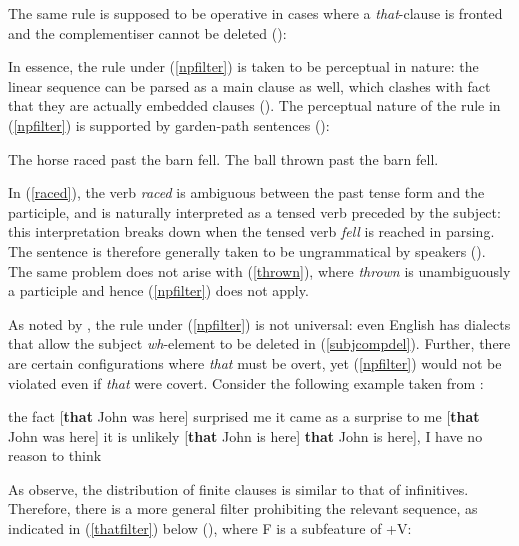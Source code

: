 \z

The same rule is supposed to be operative in cases where a \textit{that}-clause is fronted and the complementiser cannot be deleted (\citealt[436, ex. 21]{chomskylasnik1977}):

\ea
{}
\z
\z

In essence, the rule under (\ref{npfilter}) is taken to be perceptual in nature: the linear sequence can be parsed as a main clause as well, which clashes with fact that they are actually embedded clauses (\citealt[436]{chomskylasnik1977}). The perceptual nature of the rule in (\ref{npfilter}) is supported by garden-path sentences (\citealt[438, ex. 25 and 26]{chomskylasnik1977}):

\ea
\ea The horse raced past the barn fell. \label{raced}
\ex The ball thrown past the barn fell. \label{thrown}
\z
\z

In (\ref{raced}), the verb \textit{raced} is ambiguous between the past tense form and the participle, and is naturally interpreted as a tensed verb preceded by the subject: this interpretation breaks down when the tensed verb \textit{fell} is reached in parsing. The sentence is therefore generally taken to be ungrammatical by speakers (\citealt[438]{chomskylasnik1977}). The same problem does not arise with (\ref{thrown}), where \textit{thrown} is unambiguously a participle and hence (\ref{npfilter}) does not apply. 

As noted by \citet[438]{chomskylasnik1977}, the rule under (\ref{npfilter}) is not universal: even English has dialects that allow the subject \textit{wh}-element to be deleted in (\ref{subjcompdel}). Further, there are certain configurations where \textit{that} must be overt, yet (\ref{npfilter}) would not be violated even if \textit{that} were covert. Consider the following example taken from \citet[484, ex. 174a--d]{chomskylasnik1977}:

\ea
\ea the fact [\textbf{that} John was here] surprised me
\ex it came as a surprise to me [\textbf{that} John was here]
\ex it is unlikely [\textbf{that} John is here]
\ex {[}\textbf{that} John is here], I have no reason to think
\z
\z

As \citet[484]{chomskylasnik1977} observe, the distribution of finite clauses is similar to that of infinitives. Therefore, there is a more general filter prohibiting the relevant sequence, as indicated in (\ref{thatfilter}) below (\citealt[485, ex. 178]{chomskylasnik1977}), where F is a subfeature of +V:

